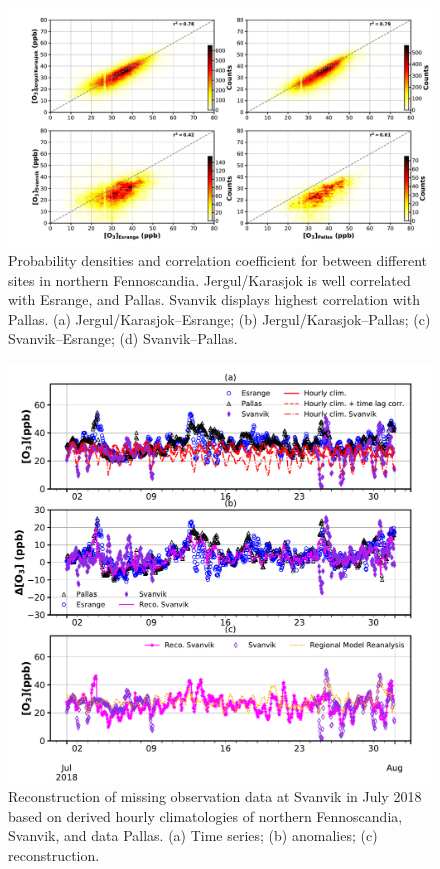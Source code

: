 \documentclass[bg, manuscript]{copernicus}
\begin{document}
\begin{figure}[t]
  \includegraphics[width=12cm]{figA2}
  \caption{Probability densities and correlation coefficient for \chem{[O_3]} between different sites in northern Fennoscandia. Jergul/Karasjok is well correlated with Esrange, and Pallas. Svanvik displays highest correlation with Pallas. (a) Jergul/Karasjok--Esrange; (b) Jergul/Karasjok--Pallas; (c) Svanvik--Esrange; (d) Svanvik--Pallas.}
  \label{fig:density_distribution}
\end{figure}

\begin{figure}[t]
  \includegraphics[width=12cm]{figA3}
  \caption{Reconstruction of missing \chem{[O_3]} observation data at Svanvik in July 2018 based on derived hourly climatologies of northern Fennoscandia, Svanvik, and data Pallas. (a) Time series; (b) anomalies; (c) reconstruction.}
  \label{fig:ozone_reconstruction_2018_07}
\end{figure}
\end{document}
